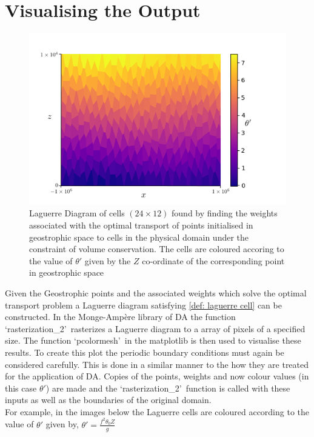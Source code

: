 \section{Visualising the Output \label{plotting}}
\begin{figure}[h]
	\centering
	\includegraphics[width=0.7\linewidth]{project/laguerre_diagram_colour}
	\caption[Coloured Laguerre Diagram of Cells]{Laguerre Diagram of cells $(24\times 12)$ found by finding the weights associated with the optimal transport of points initialised in geostrophic space to cells in the physical domain under the constraint of volume conservation. The cells are coloured accoring to the value of $\theta '$ given by the $Z$ co-ordinate of the corresponding point in geostrophic space}
	\label{fig:laguerrediagramcolour}
\end{figure}
Given the Geostrophic points and the associated weights which solve the optimal transport problem a Laguerre diagram satisfying \ref{def: laguerre cell} can be constructed. In the Monge-Amp\`{e}re library of DA \cite{Merigot2017,Merigot2017a} the function \textquoteleft rasterization\_2\textquoteright \ rasterizes a Laguerre diagram to a array of pixels of a specified size. The function \textquoteleft pcolormesh\textquoteright \ in the matplotlib is then used to visualise these results. To create this plot the periodic boundary conditions must again be considered carefully. This is done in a similar manner to the how they are treated for the application of DA. Copies of the points, weights and now colour values (in this case $\theta '$) are made and the \textquoteleft rasterization\_2\textquoteright \ function is called with these inputs as well as the boundaries of the original domain.\\
For example, in the images below the Laguerre cells are coloured according to the value of $\theta '$ given by, $\theta ' = \frac{f^2\theta_0 Z}{g}$


